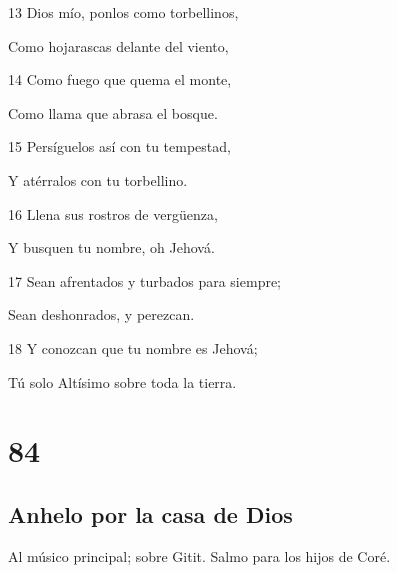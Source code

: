\par 13 Dios mío, ponlos como torbellinos,
\par Como hojarascas delante del viento,
\par 14 Como fuego que quema el monte,
\par Como llama que abrasa el bosque.
\par 15 Persíguelos así con tu tempestad,
\par Y atérralos con tu torbellino.
\par 16 Llena sus rostros de vergüenza,
\par Y busquen tu nombre, oh Jehová.
\par 17 Sean afrentados y turbados para siempre;
\par Sean deshonrados, y perezcan.
\par 18 Y conozcan que tu nombre es Jehová;
\par Tú solo Altísimo sobre toda la tierra.

\chapter{84}

\section*{Anhelo por la casa de Dios}

\par Al músico principal; sobre Gitit. Salmo para los hijos de Coré.

